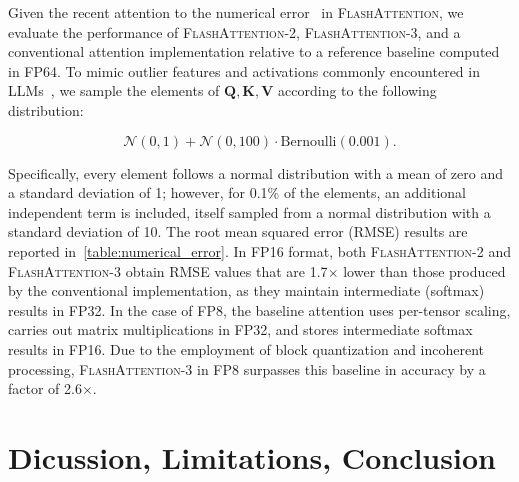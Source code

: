 Given the recent attention to the numerical error~\citep{golden2024flash} in \textsc{FlashAttention}, we evaluate the performance of \textsc{FlashAttention-2}, \textsc{FlashAttention-3}, and a conventional attention implementation relative to a reference baseline computed in FP64. To mimic outlier features and activations commonly encountered in LLMs~\citep{dettmers2208llm, sun2024massive}, we sample the elements of $\mathbf{Q}, \mathbf{K}, \mathbf{V}$ according to the following distribution:

\begin{equation*}
  \mathcal{N}(0, 1) + \mathcal{N}(0, 100) \cdot \mathrm{Bernoulli}(0.001).
\end{equation*}

Specifically, every element follows a normal distribution with a mean of zero and a standard deviation of 1; however, for 0.1\% of the elements, an additional independent term is included, itself sampled from a normal distribution with a standard deviation of 10. The root mean squared error (RMSE) results are reported in~\cref{table:numerical_error}. In FP16 format, both \textsc{FlashAttention-2} and \textsc{FlashAttention-3} obtain RMSE values that are 1.7$\times$ lower than those produced by the conventional implementation, as they maintain intermediate (softmax) results in FP32. In the case of FP8, the baseline attention uses per-tensor scaling, carries out matrix multiplications in FP32, and stores intermediate softmax results in FP16. Due to the employment of block quantization and incoherent processing, \textsc{FlashAttention-3} in FP8 surpasses this baseline in accuracy by a factor of 2.6$\times$.

\section{Dicussion, Limitations, Conclusion}
\label{sec:discussion}

